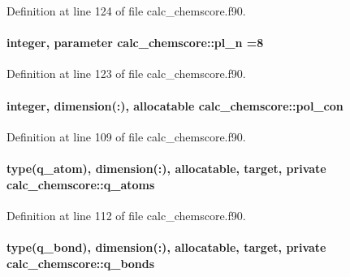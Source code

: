 Definition at line 124 of file calc\-\_\-chemscore.\-f90.

\hypertarget{classcalc__chemscore_a67e8e7ef0865731aa0ac9ca31aa4e52d}{
\paragraph[{pl\-\_\-n}]{\setlength{\rightskip}{0pt plus 5cm}integer, parameter calc\-\_\-chemscore\-::pl\-\_\-n =8}}\label{classcalc__chemscore_a67e8e7ef0865731aa0ac9ca31aa4e52d}


Definition at line 123 of file calc\-\_\-chemscore.\-f90.

\hypertarget{classcalc__chemscore_a967fddb2385d770370d95b0d762617a6}{
\paragraph[{pol\-\_\-con}]{\setlength{\rightskip}{0pt plus 5cm}integer, dimension(\-:), allocatable calc\-\_\-chemscore\-::pol\-\_\-con}}\label{classcalc__chemscore_a967fddb2385d770370d95b0d762617a6}


Definition at line 109 of file calc\-\_\-chemscore.\-f90.

\hypertarget{classcalc__chemscore_afb82a7d43bbfe0502a2131ea40819b60}{
\paragraph[{q\-\_\-atoms}]{\setlength{\rightskip}{0pt plus 5cm}type({\bf q\-\_\-atom}), dimension(\-:), allocatable, target, private calc\-\_\-chemscore\-::q\-\_\-atoms\hspace{0.3cm}{\ttfamily [private]}}}\label{classcalc__chemscore_afb82a7d43bbfe0502a2131ea40819b60}


Definition at line 112 of file calc\-\_\-chemscore.\-f90.

\hypertarget{classcalc__chemscore_ad19a31c4b53236429ca22cc9f16a8283}{
\paragraph[{q\-\_\-bonds}]{\setlength{\rightskip}{0pt plus 5cm}type({\bf q\-\_\-bond}), dimension(\-:), allocatable, target, private calc\-\_\-chemscore\-::q\-\_\-bonds\hspace{0.3cm}{\ttfamily [private]}}}\label{classcalc__chemscore_ad19a31c4b53236429ca22cc9f16a8283}


